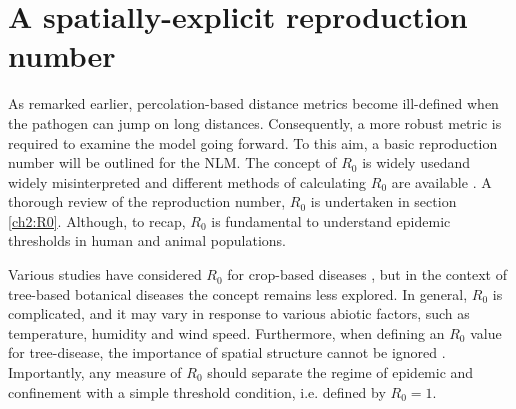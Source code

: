 
\section{A spatially-explicit reproduction number}
\label{sec:spatially-explicit-reproduction-ration}

As remarked earlier, percolation-based distance metrics become ill-defined when the pathogen can jump on long distances.
Consequently, a more robust metric is required to examine the model going forward.
To this aim, a basic reproduction number will be outlined for the NLM.
The concept of $R_0$ is widely used\textemdash and widely misinterpreted \cite{delamater2019complexity} \textemdash and different methods of calculating $R_0$ are available \cite{perspectives-on-r0}.
A thorough review of the reproduction number, $R_0$ is undertaken in section \ref{ch2:R0}. Although, to recap, $R_0$ is fundamental to understand epidemic thresholds in human and animal populations. 

Various studies have considered $R_0$ for crop-based diseases 
\cite{gubbins2000population, park2001invasion, doi:10.1146/annurev.phyto.011108.135838, van2011periodic, mikaberidze2016invasiveness},
but in the context of tree-based botanical diseases the concept remains less explored. 
In general, $R_0$ is complicated, and it may vary in response to various abiotic factors, such as temperature, humidity and wind speed.
Furthermore, when defining an $R_0$ value for tree-disease, the importance of spatial structure cannot be
ignored \cite{park2001invasion}.
Importantly, any measure of $R_0$ should separate the regime of epidemic and confinement with a simple threshold condition, i.e. defined by $R_0=1$.


